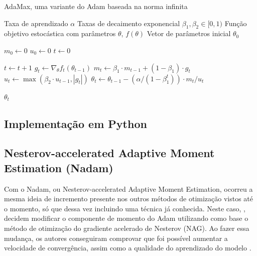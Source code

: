 \begin{algorithm}[H] %
    \caption{AdaMax, uma variante do Adam baseada na norma infinita}
    \label{alg:adamax}
    \begin{algorithmic}[1] %

    \Require Taxa de aprendizado $\alpha$
    \Require Taxas de decaimento exponencial $\beta_1, \beta_2 \in [0, 1)$
    \Require Função objetivo estocástica com parâmetros $\theta$, $f(\theta)$
    \Require Vetor de parâmetros inicial $\theta_0$

    \State $m_0 \leftarrow 0$ 
    \State $u_0 \leftarrow 0$ 
    \State $t \leftarrow 0$ 

        \State $t \leftarrow t + 1$
        \State $g_t \leftarrow \nabla_\theta f_t(\theta_{t-1})$ 
        \State $m_t \leftarrow \beta_1 \cdot m_{t-1} + (1 - \beta_1) \cdot g_t$ 
        \State $u_t \leftarrow \max(\beta_2 \cdot u_{t-1}, |g_t|)$ 
        \State $\theta_t \leftarrow \theta_{t-1} - (\alpha / (1 - \beta_1^t)) \cdot m_t / u_t$ 
    \EndWhile

    \State \Return $\theta_t$ 
    \end{algorithmic}
\end{algorithm}

\subsection{Implementação em Python}

\subsection{Nesterov-accelerated Adaptive Moment Estimation (Nadam)}

Com o Nadam, ou Nesterov-accelerated Adaptive Moment Estimation, ocorreu a mesma ideia de incremento presente nos outros métodos de otimização vistos até o momento, só que dessa vez incluindo uma técnica já conhecida. Neste caso, \textcite{NadamMethod}, decidem modificar o componente de momento do Adam utilizando como base o método de otimização do gradiente acelerado de Nesterov (NAG). Ao fazer essa mudança, os autores conseguiram comprovar que foi possível aumentar a velocidade de convergência, assim como a qualidade do aprendizado do modelo \parencite{NadamMethod}.

